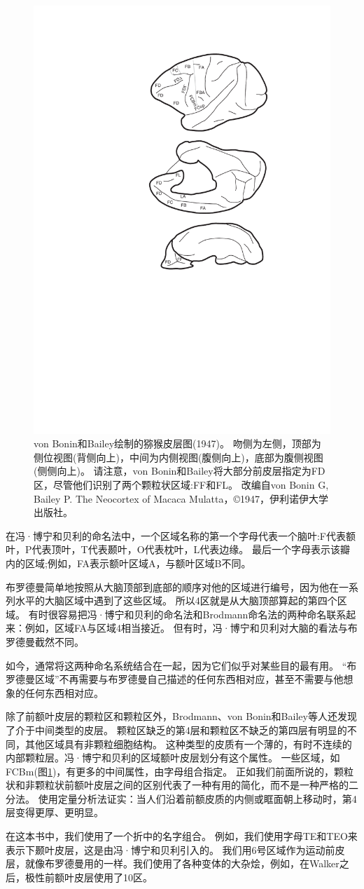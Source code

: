 \begin{figure}[!htb]
	\centering
	\includegraphics[width=0.5\linewidth]{chap1/1_1}
	\caption{von Bonin和Bailey绘制的猕猴皮层图(1947)。
		吻侧为左侧，顶部为侧位视图(背侧向上)，中间为内侧视图(腹侧向上)，底部为腹侧视图(侧侧向上)。
		请注意，von Bonin和Bailey将大部分前皮层指定为FD区，尽管他们识别了两个颗粒状区域:FF和FL。
		改编自von Bonin G, Bailey P. The Neocortex of Macaca Mulatta，©1947，伊利诺伊大学出版社。\label{fig:1_1}}
\end{figure}

\par
在冯·博宁和贝利的命名法中，一个区域名称的第一个字母代表一个脑叶:F代表额叶，P代表顶叶，T代表颞叶，O代表枕叶，L代表边缘。
最后一个字母表示该瓣内的区域;例如，FA表示额叶区域A，与额叶区域B不同。
\par
布罗德曼简单地按照从大脑顶部到底部的顺序对他的区域进行编号，因为他在一系列水平的大脑区域中遇到了这些区域。
所以4区就是从大脑顶部算起的第四个区域。
有时很容易把冯·博宁和贝利的命名法和Brodmann命名法的两种命名联系起来：例如，区域FA与区域4相当接近。
但有时，冯·博宁和贝利对大脑的看法与布罗德曼截然不同。
\par
如今，通常将这两种命名系统结合在一起，因为它们似乎对某些目的最有用。
“布罗德曼区域”不再需要与布罗德曼自己描述的任何东西相对应，甚至不需要与他想象的任何东西相对应。
\par
除了前额叶皮层的颗粒区和颗粒区外，Brodmann、von Bonin和Bailey等人还发现了介于中间类型的皮层。
颗粒区缺乏的第4层和颗粒区不缺乏的第四层有明显的不同，其他区域具有非颗粒细胞结构。
这种类型的皮质有一个薄的，有时不连续的内部颗粒层。冯·博宁和贝利的区域额叶皮层划分有这个属性。
一些区域，如FCBm(图\ref{fig:1_1})，有更多的中间属性，由字母组合指定。
正如我们前面所说的，颗粒状和非颗粒状前额叶皮层之间的区别代表了一种有用的简化，而不是一种严格的二分法。
使用定量分析法证实：当人们沿着前额皮质的内侧或眶面朝上移动时，第4层变得更厚、更明显\cite{mackey2010quantitative}。
\par
在这本书中，我们使用了一个折中的名字组合。
例如，我们使用字母TE和TEO来表示下颞叶皮层，这是由冯·博宁和贝利引入的。
我们用6号区域作为运动前皮层，就像布罗德曼用的一样。我们使用了各种变体的大杂烩，例如，在Walker\cite{walker1940cytoarchitectural}之后，极性前额叶皮层使用了10区。



